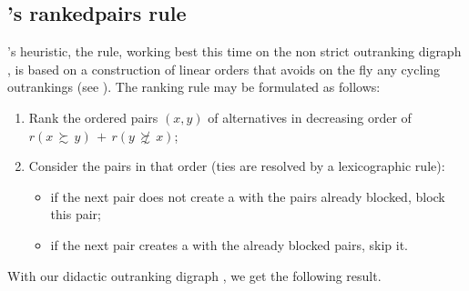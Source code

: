 \documentclass[a4paper,12pt,english]{sphinxhowto}
\begin{document}
\subsection{’s ranked\sphinxhyphen{}pairs rule}
\label{\detokenize{tutorial:tideman-s-ranked-pairs-rule}}
’s  heuristic, the  rule, working best this time on the non strict outranking digraph , is based on a  construction of linear orders that avoids on the fly any cycling outrankings (see ). The ranking rule may be formulated as follows:
\begin{enumerate}
%
\item {} 
Rank the ordered pairs \((x,y)\) of alternatives in decreasing order of \(r(x\, \succsim \,y) \,+\, r(y\, \not\succsim \,x)\);

\item {} 
Consider the pairs in that order (ties are resolved by a lexicographic rule):
\begin{itemize}
\item {} 
if the next pair does not create a  with the pairs already blocked, block this pair;

\item {} 
if the next pair creates a  with the already blocked pairs, skip it.

\end{itemize}

\end{enumerate}

With our didactic outranking digraph , we get the following result.
\def\sphinxLiteralBlockLabel{\label{\detokenize{tutorial:rankedpairsranking}}}
\begin{sphinxVerbatim}[commandchars=\\\{\},numbers=left,firstnumber=1,stepnumber=1]
   
  
\end{sphinxVerbatim}
\end{document}
